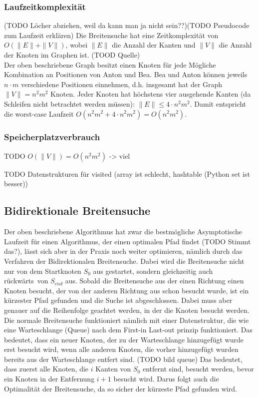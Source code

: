 \documentclass[a4paper,10pt,ngerman]{scrartcl}
\begin{document}
    \subsubsection{Laufzeitkomplexität} (TODO Löcher abziehen, weil da kann man ja nicht sein??)(TODO Pseudocode zum Laufzeit erklären)
    Die Breitensuche hat eine Zeitkomplexität von $O(\|E\| + \|V\|)$, wobei $\|E\|$ die Anzahl der Kanten und $\|V\|$ die Anzahl der Knoten im Graphen ist. (TOOD Quelle) \\
    Der oben beschriebene Graph besitzt einen Knoten für jede Mögliche Kombination an Positionen von Anton und Bea. Bea und Anton können jeweils $n \cdot m$ verschiedene Positionen einnehmen, d.h. insgesamt hat der Graph $\|V\| = n^2 m^2$ Knoten.
    Jeder Knoten hat höchstens vier ausgehende Kanten (da Schleifen nicht betrachtet werden müssen): $\|E\| \le 4 \cdot n ^2 m^2$. Damit entspricht die worst-case Laufzeit $O(n^2 m^2 + 4 \cdot n^2 m^2) = O(n^2 m^2)$.

    \subsubsection{Speicherplatzverbrauch}
    TODO $O(\| V \|) = O(n^2 m^2)$ -> viel


    TODO Datenstrukturen für visited (array ist schlecht, hashtable (Python set ist besser))

    \subsection{Bidirektionale Breitensuche}
    Der oben beschriebene Algorithmus hat zwar die bestmögliche Asymptotische Laufzeit für einen Algorithmus, der einen optimalen Pfad findet (TODO Stimmt das?), lässt sich aber in der Praxis noch weiter optimieren, nämlich durch das Verfahren der Bidirektionalen Breitensuche. Dabei wird die Breitensuche nicht nur von dem Startknoten $S_0$ aus gestartet, sondern gleichzeitig auch \glqq rückwärts\grqq~von $S_{end}$ aus. Sobald die Breitensuche aus der einen Richtung einen Knoten besucht, der von der anderen Richtung aus schon besucht wurde, ist ein kürzester Pfad gefunden und die Suche ist abgeschlossen.
    Dabei muss aber genauer auf die Reihenfolge geachtet werden, in der die Knoten besucht werden.
    Die normale Breitensuche funktioniert nämlich mit einer Datenstruktur, die wie eine Warteschlange (Queue) nach dem First-in Last-out prinzip funktioniert. Das bedeutet, dass ein neuer Knoten, der zu der Warteschlange hinzugefügt wurde erst besucht wird, wenn alle anderen Knoten, die vorher hinzugefügt wurden bereits aus der Warteschlange entfert sind. (TODO bild queue) Das bedeutet, dass zuerst alle Knoten, die $i$ Kanten von $S_0$ entfernt sind, besucht werden, bevor ein Knoten in der Entfernung $i+1$ besucht wird. Darus folgt auch die Optimalität der Breitensuche, da so sicher der kürzeste Pfad gefunden wird. \\
\end{document}
